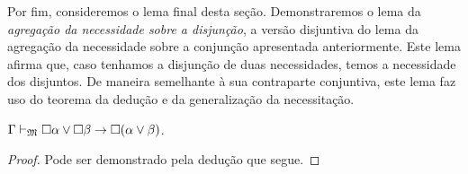 \vspace{.5\baselineskip}
Por fim, consideremos o lema final desta seção.
Demonstraremos o lema da \emph{agregação da necessidade sobre a disjunção}, a versão disjuntiva do lema da agregação da necessidade sobre a conjunção apresentada anteriormente.
Este lema afirma que, caso tenhamos a disjunção de duas necessidades, temos a necessidade dos disjuntos.
De maneira semelhante à sua contraparte conjuntiva, este lema faz uso do teorema da dedução e da generalização da necessitação.

\vspace{.5\baselineskip}
\begin{tcolorbox}[enhanced jigsaw, breakable, sharp corners, colframe=black, colback=white, boxrule=0.5pt, left=1.5mm, right=1.5mm, top=1.5mm, bottom=1.5mm]
    \begin{lemma}\label{necessity.disjunction.undistribution}
        $\Gamma\mathrel{\vdash}_\mathfrak{M}\Box\alpha\vee\Box\beta\to\Box(\alpha\vee\beta)$.
        \begin{proof}
        Pode ser demonstrado pela dedução que segue.


\end{proof}
\end{lemma}
\end{tcolorbox}
